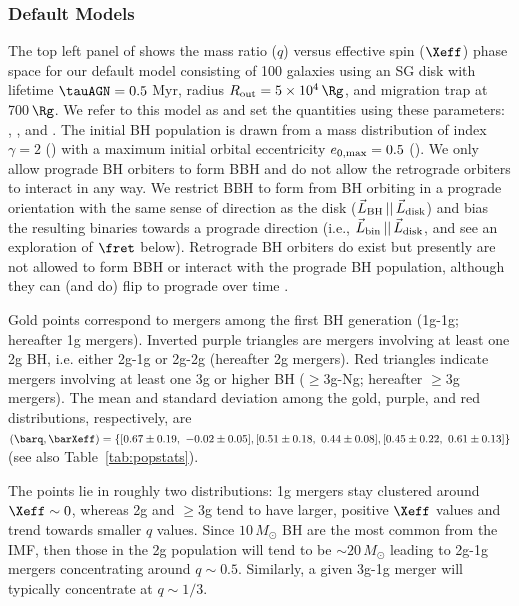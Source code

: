 \subsubsection{Default Models}
The top left panel of  shows the mass ratio ($q$) versus effective spin ($\Xeff$) phase space for our default model consisting of 100 galaxies using an SG disk with lifetime $\tauAGN = 0.5$ Myr, radius $R_{\rm out} = 5\times 10^4\,\Rg$, and migration trap at 700$\,\Rg$.
We refer to this model as  and set the quantities using these  parameters: , , and .
The initial BH population is drawn from a mass distribution of index $\gamma=2$ () with a maximum initial orbital eccentricity $e_{\rm 0,max}=0.5$ ().
We only allow prograde BH orbiters to form BBH and do not allow the retrograde orbiters to interact in any way.
We restrict BBH to form from BH orbiting in a prograde orientation with the same sense of direction as the disk ($\vec{L}_{\rm BH}\,||\,\vec{L}_{\rm disk}$) and bias the resulting binaries towards a prograde direction (i.e., $\vec{L}_{\rm bin}\,||\,\vec{L}_{\rm disk}$, and see an exploration of $\fret$ below).
Retrograde BH orbiters do exist but presently are not allowed to form BBH or interact with the prograde BH population, although they can (and do) flip to prograde over time \citep{McKernan+25-mcfactsI}.

Gold points correspond to mergers among the first BH generation (1g-1g; hereafter 1g mergers).
Inverted purple triangles are mergers involving at least one 2g BH, i.e. either 2g-1g or 2g-2g (hereafter 2g mergers).
Red triangles indicate mergers involving at least one 3g or higher BH ($\geq$3g-Ng; hereafter $\geq$3g mergers).
The mean and standard deviation among the gold, purple, and red distributions, respectively, are $(\barq,\barXeff)=\{[0.67\pm 0.19,\ -0.02\pm 0.05], [0.51\pm 0.18,\ 0.44\pm 0.08], [0.45\pm 0.22,\ 0.61\pm 0.13]\}$ (see also Table~\ref{tab:popstats}).

The points lie in roughly two distributions: 1g mergers stay clustered around $\Xeff \sim 0$, whereas 2g and $\geq$3g tend to have larger, positive $\Xeff$ values and trend towards smaller $q$ values.
Since $10\,M_{\odot}$ BH are the most common from the IMF, then those in the 2g population will tend to be $\sim 20\,M_{\odot}$ leading to 2g-1g mergers concentrating around $q \sim 0.5$.
Similarly, a given 3g-1g merger will typically concentrate at $q \sim 1/3$.

